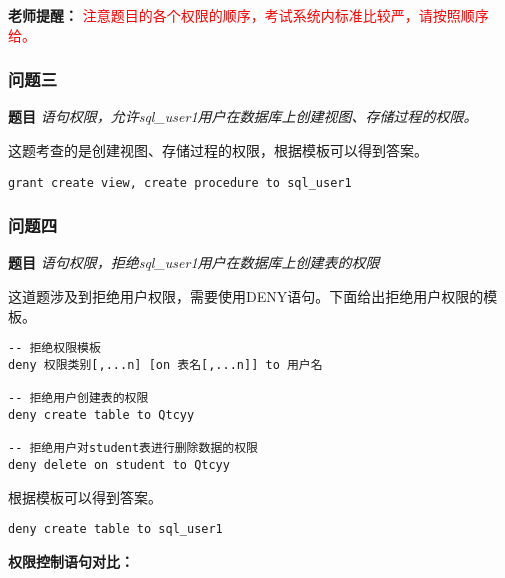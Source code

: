 \textbf{老师提醒：} \textcolor{Red}{注意题目的各个权限的顺序，考试系统内标准比较严，请按照顺序给。}

\subsubsection{问题三}

\textbf{题目} \emph{语句权限，允许sql\_user1用户在数据库上创建视图、存储过程的权限。}

\vspace{6pt}

\qquad 这题考查的是创建视图、存储过程的权限，根据模板可以得到答案。

\begin{mdframed}[backgroundcolor=blue!5]
\begin{verbatim}
grant create view, create procedure to sql_user1
\end{verbatim}
\end{mdframed}

\subsubsection{问题四}

\textbf{题目} \emph{语句权限，拒绝sql\_user1用户在数据库上创建表的权限}

\vspace{6pt}

\qquad 这道题涉及到拒绝用户权限，需要使用DENY语句。下面给出拒绝用户权限的模板。

\begin{mdframed}[backgroundcolor=gray!10]
\begin{verbatim}
-- 拒绝权限模板
deny 权限类别[,...n] [on 表名[,...n]] to 用户名

-- 拒绝用户创建表的权限
deny create table to Qtcyy

-- 拒绝用户对student表进行删除数据的权限
deny delete on student to Qtcyy
\end{verbatim}
\end{mdframed}

\qquad 根据模板可以得到答案。

\begin{mdframed}[backgroundcolor=blue!5]
\begin{verbatim}
deny create table to sql_user1
\end{verbatim}
\end{mdframed}

\qquad \textbf{权限控制语句对比：}

